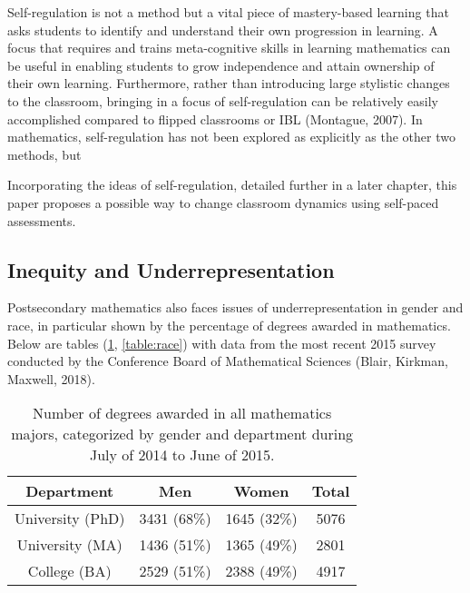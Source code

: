 Self-regulation is not a method but a vital piece of mastery-based learning that asks students to identify and understand their own progression in learning. A focus that requires and trains meta-cognitive skills in learning mathematics can be useful in enabling students to grow independence and attain ownership of their own learning. Furthermore, rather than introducing large stylistic changes to the classroom, bringing in a focus of self-regulation can be relatively easily accomplished compared to flipped classrooms or IBL (Montague, 2007). In mathematics, self-regulation has not been explored as explicitly as the other two methods, but

Incorporating the ideas of self-regulation, detailed further in a later chapter, this paper proposes a possible way to change classroom dynamics using self-paced assessments.

\subsection{Inequity and Underrepresentation}
Postsecondary mathematics also faces issues of underrepresentation in gender and race, in particular shown by the percentage of degrees awarded in mathematics. Below are tables (\ref{table:gender}, \ref{table:race}) with data from the most recent 2015 survey conducted by the Conference Board of Mathematical Sciences (Blair, Kirkman, Maxwell, 2018).
\begin{table}[!htb]
  \begin{center}
    \begin{tabular}{c | c | c | c}
      Department & Men & Women & Total\\ \hline
      University (PhD) & 3431 (68\%) & 1645 (32\%) & 5076\\
      University (MA) & 1436 (51\%) & 1365 (49\%) & 2801\\
      College (BA) & 2529 (51\%) & 2388 (49\%) & 4917
    \end{tabular}
  \end{center}
  \caption{Number of degrees awarded in all mathematics majors, categorized by gender and department during July of 2014 to June of 2015.}
  \label{table:gender}
\end{table}

